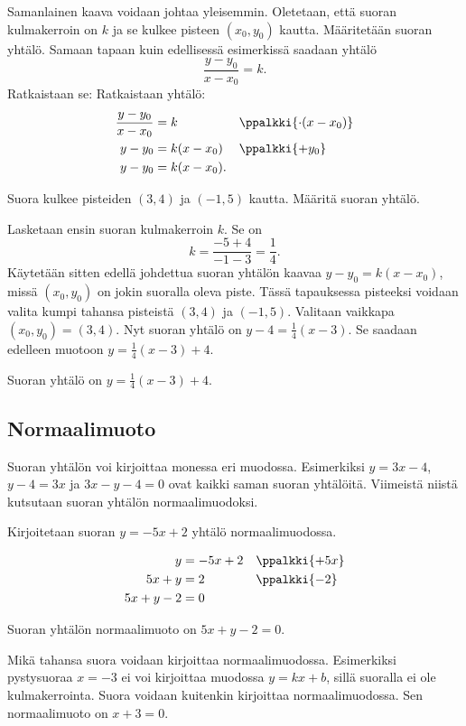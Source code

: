 Samanlainen kaava voidaan johtaa yleisemmin. Oletetaan, että suoran kulmakerroin on $k$ ja se kulkee pisteen $(x_0, y_0)$ kautta. Määritetään suoran yhtälö.
Samaan tapaan kuin edellisessä esimerkissä saadaan yhtälö
\[
\frac{y-y_0}{x-x_0}=k.
\]
Ratkaistaan se:
Ratkaistaan yhtälö:
\begin{align*}
\frac{y-y_0}{x-x_0}&=k && \ppalkki{\cdot (x-x_0)}\\
y-y_0&=k(x-x_0) && \ppalkki{+y_0} \\
y-y_0&=k(x-x_0). &&
\end{align*}


\begin{esimerkki}
Suora kulkee pisteiden $(3, 4)$ ja $(-1, 5)$ kautta. Määritä suoran yhtälö.

\begin{esimratk}
Lasketaan ensin suoran kulmakerroin $k$. Se on
\[
k=\frac{-5+4}{-1-3}=\frac{1}{4}.
\]
Käytetään sitten edellä johdettua suoran yhtälön kaavaa $y-y_0=k(x-x_0)$, missä $(x_0, y_0)$ on jokin suoralla oleva piste. Tässä tapauksessa pisteeksi voidaan valita kumpi tahansa pisteistä $(3, 4)$ ja $(-1, 5)$.
Valitaan vaikkapa $(x_0, y_0)=(3, 4)$. Nyt suoran yhtälö on $y-4=\frac{1}{4}(x-3)$. Se saadaan edelleen muotoon $y=\frac{1}{4}(x-3)+4$.
\end{esimratk}
\begin{esimvast}
Suoran yhtälö on $y=\frac{1}{4}(x-3)+4$.
\end{esimvast}
\end{esimerkki}

\subsection*{Normaalimuoto}

Suoran yhtälön voi kirjoittaa monessa eri muodossa. Esimerkiksi $y=3x-4$, $y-4=3x$ ja $3x-y-4=0$ ovat kaikki saman suoran yhtälöitä. Viimeistä niistä kutsutaan 
suoran yhtälön normaalimuodoksi.


\begin{esimerkki}
Kirjoitetaan suoran $y=-5x+2$ yhtälö normaalimuodossa.
\begin{esimratk}
\begin{align*}
y&=-5x+2 && \ppalkki{+5x} \\
5x+y&=2 && \ppalkki{-2} \\
5x+y-2&=0 &&
\end{align*}
\end{esimratk}
\begin{esimvast}
Suoran yhtälön normaalimuoto on $5x+y-2=0$.
\end{esimvast}
\end{esimerkki}


Mikä tahansa suora voidaan kirjoittaa normaalimuodossa. Esimerkiksi pystysuoraa $x=-3$ ei voi kirjoittaa muodossa $y=kx+b$, sillä suoralla ei ole kulmakerrointa. Suora voidaan kuitenkin kirjoittaa normaalimuodossa. Sen normaalimuoto on $x+3=0$.
